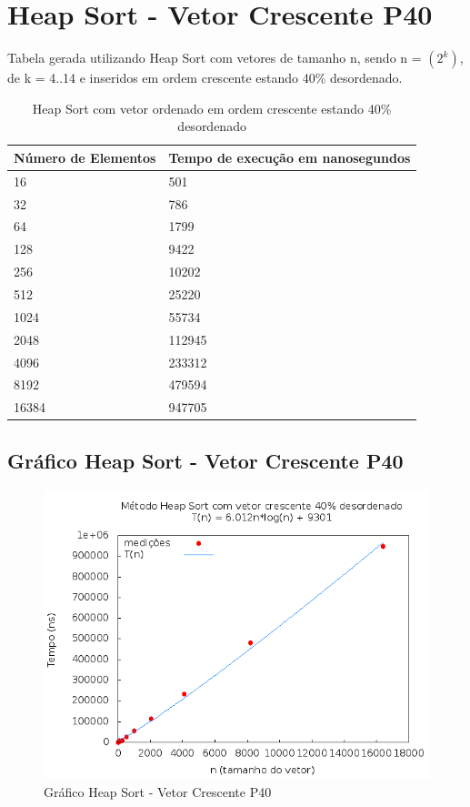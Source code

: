 \documentclass[12pt,a4paper,twoside]{report}
\begin{document}
\section{Heap Sort - Vetor Crescente P40}
Tabela gerada utilizando Heap Sort com vetores de tamanho n, sendo n = $(2^k)$, de k = 4..14 e inseridos em ordem crescente estando 40\% desordenado.
\begin{table}[H]
\centering
\caption{Heap Sort com vetor ordenado em ordem crescente estando 40\% desordenado}
\label{my-label}
\begin{tabular}{|l|l|}
\hline
\multicolumn{1}{|c|}{\textbf{Número de Elementos}} & \multicolumn{1}{c|}{\textbf{Tempo de execução em nanosegundos}} \\ \hline
16 & 501 \\ \hline
32 & 786 \\ \hline
64 & 1799 \\ \hline
128 & 9422 \\ \hline
256 & 10202 \\ \hline
512 & 25220 \\ \hline
1024 & 55734 \\ \hline
2048 & 112945 \\ \hline
4096 & 233312 \\ \hline
8192 & 479594 \\ \hline
16384 & 947705 \\ \hline
\end{tabular}
\end{table}

\subsection{Gráfico Heap Sort - Vetor Crescente P40}
\begin{figure}[H]
    \centering
    \includegraphics[width=0.7\linewidth]{graficos/HeapSort/vIntCrescenteP40/vIntCrescenteP40.png}
  \caption{Gráfico Heap Sort - Vetor Crescente P40}
\end{figure}
\end{document}

